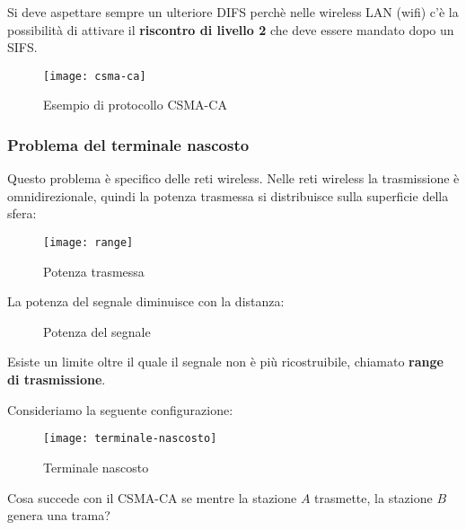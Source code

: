 \documentclass[a4paper]{article}
\begin{document}
\vspace{1em}
\noindent
Si deve aspettare sempre un ulteriore DIFS perchè nelle wireless LAN (wifi) c'è la
possibilità di attivare il \textbf{riscontro di livello 2} che deve essere mandato
dopo un SIFS.
\begin{figure}[H]
  \centering
  \texttt{[image: csma-ca]}
  \caption{Esempio di protocollo CSMA-CA}
\end{figure}

\subsubsection{Problema del terminale nascosto}
Questo problema è specifico delle reti wireless. Nelle reti wireless la trasmissione
è omnidirezionale, quindi la potenza trasmessa si distribuisce sulla superficie
della sfera:
\begin{figure}[H]
  \centering
  \texttt{[image: range]}
  \caption{Potenza trasmessa}
\end{figure}
\noindent
La potenza del segnale diminuisce con la distanza:
\begin{figure}[H]
  \centering
  \caption{Potenza del segnale}
\end{figure}
\noindent
Esiste un limite oltre il quale il segnale non è più ricostruibile, chiamato
\textbf{range di trasmissione}.

\vspace{1em}
\noindent
Consideriamo la seguente configurazione:
\begin{figure}[H]
  \centering
  \texttt{[image: terminale-nascosto]}
  \caption{Terminale nascosto}
\end{figure}
\noindent
Cosa succede con il CSMA-CA se mentre la stazione \( A \) trasmette, la stazione
\( B \) genera una trama?
\end{document}
